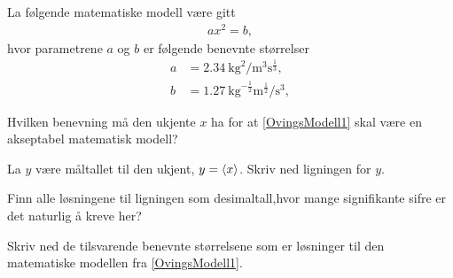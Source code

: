 \documentclass[a4paper,11pt]{article}
\begin{document}

\begin{problem}[14]
    La følgende matematiske modell være gitt
    \begin{align}
      ax^2=b,\label{OvingsModell1}
    \end{align}
    hvor parametrene $a$ og $b$ er følgende benevnte
    størrelser
    \begin{align*}
      a &= \SI{2.34}{\kg\squared\per\m\cubed\s\tothe{\frac{1}{3}}},\\
      b &= \SI{1.27}{\kg\tothe{-\frac{1}{2}}\m\tothe{\frac{1}{2}}\per\s\cubed},
    \end{align*}
\end{problem}
    \begin{subproblem}
        \label{subproblem:MAT-0001-Notat-2.6.6-Problem-14a}
      Hvilken benevning må den ukjente $x$ ha for at \cref{OvingsModell1}
        skal være en akseptabel matematisk modell?
        \end{subproblem}
        \begin{subproblem}
        \label{subproblem:MAT-0001-Notat-2.6.6-Problem-14b}
      La $y$ være måltallet til den ukjent, $y=\langle x\rangle$. Skriv ned
        ligningen for $y$.
        \end{subproblem}
        \begin{subproblem}
        \label{subproblem:MAT-0001-Notat-2.6.6-Problem-14c}
      Finn alle løsningene til ligningen som desimaltall,hvor mange
        signifikante sifre er det naturlig å kreve her?
        \end{subproblem}
        \begin{subproblem}
        \label{subproblem:MAT-0001-Notat-2.6.6-Problem-14d}
      Skriv ned de tilsvarende benevnte størrelsene som er løsninger til
        den matematiske modellen fra \cref{OvingsModell1}.
        \end{subproblem}
\end{document}
